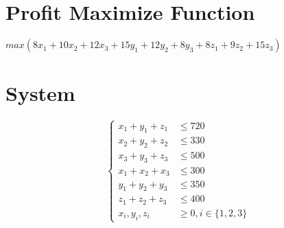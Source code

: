 \documentclass[12pt, a4paper]{article}
\begin{document}
\section{Profit Maximize Function}


$max(8x_1 + 10x_2 + 12x_3 + 15y_1 + 12y_2 + 8y_3 + 8z_1 + 9z_2 + 15z_3)$


\section{System}
\[
\begin{cases}
    x_1 + y_1 + z_1 & \leq 720 \\
    x_2 + y_2 + z_2 & \leq 330 \\
    x_3 + y_3 + z_3 & \leq 500 \\
    x_1 + x_2 + x_3 & \leq 300 \\
    y_1 + y_2 + y_3 & \leq 350 \\
    z_1 + z_2 + z_3 & \leq 400 \\
    x_i, y_i, z_i & \geq 0, i \in \{1, 2, 3\}
\end{cases}
\]  
\end{document}
